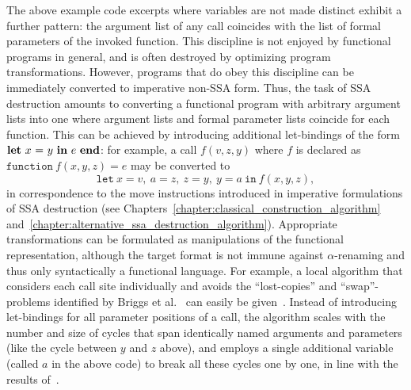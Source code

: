 {The above example code excerpts where variables are not made distinct
exhibit a further pattern: the argument list of any call coincides
with the list of formal parameters of the invoked function. This
discipline is not enjoyed by functional programs in general, and is
often destroyed by optimizing program transformations. However,
programs that do obey this discipline can be immediately converted to
imperative non-SSA form. Thus, the task of SSA destruction amounts to
converting a functional program with arbitrary argument lists into one
where argument lists and formal parameter lists coincide for each
function. This can be achieved by introducing additional let-bindings
of the form $\mathbf{let}\ {x}\ \mathbf{=}\ {y}\ \mathbf{in}\ {e}\ \mathbf{end}$: for example, a call $f(v,z,y)$ where $f$
is declared as $\mathtt{function}\ f(x,y,z) = e$ may be converted to
$$\mathtt{let}\ x = v,\ a = z,\ z = y,\ y = a\ \mathtt{in}\ {f(x,y,z)},$$ in
correspondence to the move instructions introduced in imperative
formulations of SSA destruction (see
Chapters~\ref{chapter:classical_construction_algorithm}
and~\ref{chapter:alternative_ssa_destruction_algorithm}). Appropriate
transformations can be formulated as manipulations of the functional
representation, although the target format is not immune against
$\alpha$-renaming and thus only syntactically a functional
language. For example, a local algorithm that considers each call site
individually and avoids the ``lost-copies'' and ``swap''-problems
identified by Briggs et al.~\cite{DBLP:journals/spe/BriggsCHS98} can
easily be given~\cite{DBLP:journals/entcs/Beringer07}. Instead of
introducing let-bindings for all parameter positions of a call, the
algorithm scales with the number and size of cycles that span
identically named arguments and parameters (like the cycle between $y$
and $z$ above), and employs a single additional variable (called $a$
in the above code) to break all these cycles one by one, in line with
the results of~\cite{May:1989:PAP:68018.68035}.


\newcommand{\entrynode}[0]{\ensuremath{\mathbf{entry}}}
\newcommand{\exitnode}[0]{\ensuremath{\mathbf{exit}}}
}
